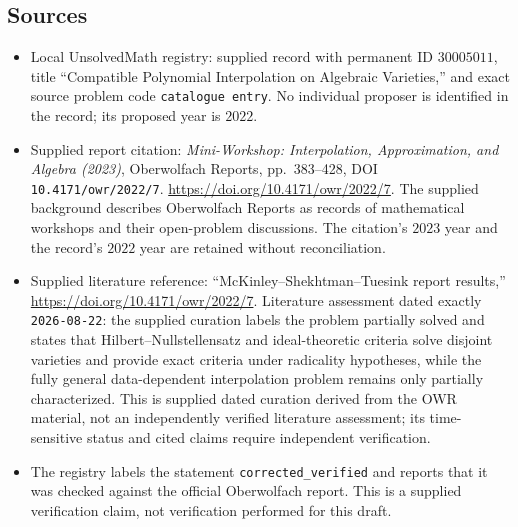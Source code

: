 \documentclass[11pt]{article}
\begin{document}
\subsection{Sources}
\begin{itemize}
\item Local UnsolvedMath registry: supplied record with permanent ID \(30005011\), title ``Compatible Polynomial Interpolation on Algebraic Varieties,'' and exact source problem code \texttt{catalogue entry}. No individual proposer is identified in the record; its proposed year is \(2022\).
\item Supplied report citation: \emph{Mini-Workshop: Interpolation, Approximation, and Algebra (2023)}, Oberwolfach Reports, pp.~383--428, DOI \texttt{10.4171/owr/2022/7}. \url{https://doi.org/10.4171/owr/2022/7}. The supplied background describes Oberwolfach Reports as records of mathematical workshops and their open-problem discussions. The citation's \(2023\) year and the record's \(2022\) year are retained without reconciliation.
\item Supplied literature reference: ``McKinley--Shekhtman--Tuesink report results,'' \url{https://doi.org/10.4171/owr/2022/7}. Literature assessment dated exactly \texttt{2026-08-22}: the supplied curation labels the problem partially solved and states that Hilbert--Nullstellensatz and ideal-theoretic criteria solve disjoint varieties and provide exact criteria under radicality hypotheses, while the fully general data-dependent interpolation problem remains only partially characterized. This is supplied dated curation derived from the OWR material, not an independently verified literature assessment; its time-sensitive status and cited claims require independent verification.
\item The registry labels the statement \texttt{corrected\_verified} and reports that it was checked against the official Oberwolfach report. This is a supplied verification claim, not verification performed for this draft.
\end{itemize}
\end{document}
